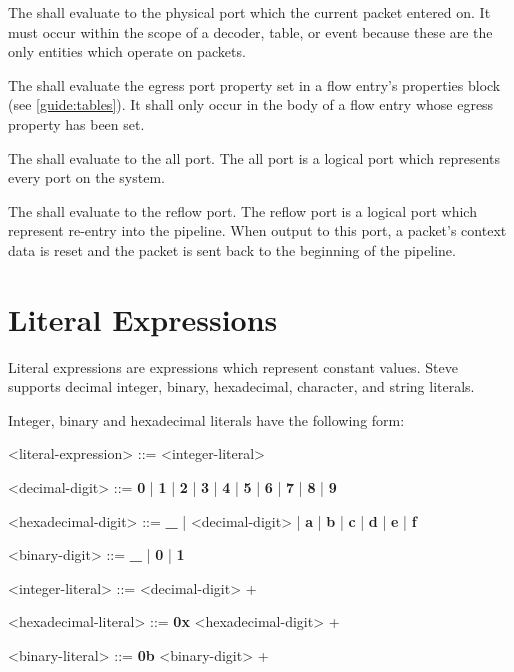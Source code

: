The  shall evaluate to the physical port which the current packet entered on. It must occur within the scope of a decoder, table, or event because these are the only entities which operate on packets.

The  shall evaluate the egress port property set in a flow entry's properties block (see \ref{guide:tables}). It shall only occur in the body of a flow entry whose egress property has been set.

The  shall evaluate to the all port. The all port is a logical port which represents every port on the system.

The  shall evaluate to the reflow port. The reflow port is a logical port which represent re-entry into the pipeline. When output to this port, a packet's context data is reset and the packet is sent back to the beginning of the pipeline.

\section{Literal Expressions} \label{guide:literal_expr}

Literal expressions are expressions which represent constant values. Steve supports decimal integer, binary, hexadecimal, character, and string literals.

Integer, binary and hexadecimal literals have the following form:

\begin{minip}
\begin{grammar}
<literal-expression> ::=
<integer-literal>

<decimal-digit> ::= \textbf{0} | \textbf{1} | \textbf{2} | \textbf{3} | \textbf{4} | \textbf{5} | \textbf{6} | \textbf{7} | \textbf{8} | \textbf{9}

<hexadecimal-digit> ::= \textbf{\_} | <decimal-digit> | \textbf{a} | \textbf{b} | \textbf{c} | \textbf{d} | \textbf{e} | \textbf{f}             

<binary-digit> ::= \textbf{\_} | \textbf{0} | \textbf{1}

<integer-literal> ::=
<decimal-digit> +

<hexadecimal-literal> ::=
\textbf{0x} <hexadecimal-digit> +

<binary-literal> ::=
\textbf{0b} <binary-digit> +
\end{grammar}
\end{minip}


